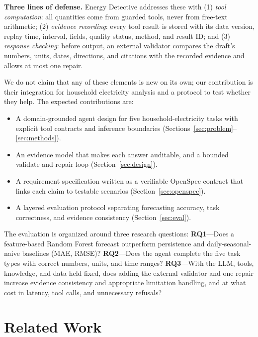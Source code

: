 \documentclass[conference]{IEEEtran}
\begin{document}
\textbf{Three lines of defense.} Energy Detective addresses these with
(1) \emph{tool computation}: all quantities come from guarded tools,
never from free-text arithmetic; (2) \emph{evidence recording}: every
tool result is stored with its data version, replay time, interval,
fields, quality status, method, and result ID; and (3) \emph{response
checking}: before output, an external validator compares the draft's
numbers, units, dates, directions, and citations with the recorded
evidence and allows at most one repair.

We do not claim that any of these elements is new on its own; our
contribution is their integration for household electricity analysis
and a protocol to test whether they help. The expected contributions
are:
\begin{itemize}
  \item A domain-grounded agent design for five household-electricity
        tasks with explicit tool contracts and inference boundaries
        (Sections~\ref{sec:problem}--\ref{sec:methods}).
  \item An evidence model that makes each answer auditable, and a
        bounded validate-and-repair loop (Section~\ref{sec:design}).
  \item A requirement specification written as a verifiable OpenSpec
        contract that links each claim to testable scenarios
        (Section~\ref{sec:openspec}).
  \item A layered evaluation protocol separating forecasting accuracy,
        task correctness, and evidence consistency
        (Section~\ref{sec:eval}).
\end{itemize}

The evaluation is organized around three research questions:
\textbf{RQ1}---Does a feature-based Random Forest forecast outperform
persistence and daily-seasonal-naive baselines (MAE, RMSE)?
\textbf{RQ2}---Does the agent complete the five task types with correct
numbers, units, and time ranges?
\textbf{RQ3}---With the LLM, tools, knowledge, and data held fixed,
does adding the external validator and one repair increase evidence
consistency and appropriate limitation handling, and at what cost in
latency, tool calls, and unnecessary refusals?

\section{Related Work}
\end{document}
